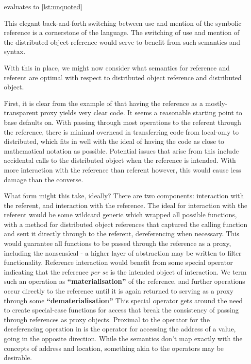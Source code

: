 
evaluates to \cref{lst:unquoted}


This elegant back-and-forth switching between use and mention of the
symbolic reference is a cornerstone of the language. The switching of
use and mention of the distributed object reference would serve to
benefit from such semantics and syntax.

With this in place, we might now consider what semantics for reference
and referent are optimal with respect to distributed object reference
and distributed object.

First, it is clear from the example of  that having the reference as
a mostly-transparent proxy yields very clear code. It seems a reasonable
starting point to base defaults on. With passing through most operations
to the referent through the reference, there is minimal overhead in
transferring code from local-only to distributed, which fits in well
with the ideal of having the code as close to mathematical notation as
possible. Potential issues that arise from this include accidental calls
to the distributed object when the reference is intended. With more
interaction with the reference than referent however, this would cause
less damage than the converse.

What form might this take, ideally? There are two components:
interaction with the referent, and interaction with the reference. The
ideal for interaction with the referent would be some wildcard generic
which wrapped all possible functions, with a method for distributed
object references that captured the calling function and sent it
directly through to the referent, dereferencing when necessary. This
would guarantee all functions to be passed through the reference as a
proxy, including the nonsensical - a higher layer of abstraction may be
written to filter functionality. Reference interaction would benefit
from some special operator indicating that the reference \emph{per se}
is the intended object of interaction. We term such an operation as
\textbf{``materialisation''} of the reference, and further operations
occur directly to the reference until it is again returned to serving as
a proxy through some \textbf{``dematerialisation''} This special
operator gets around the need to create special-case functions for
access that break the consistency of passing through references as proxy
objects. Proximal to the  operator for the dereferencing
operation in  is the  operator for accessing the address of
a value, going in the opposite direction. While the semantics don't map
exactly with the concepts of address and location, something akin to the
operators may be desirable.

